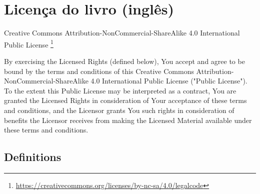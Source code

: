 \chapter{Licença do livro (inglês)}

Creative Commons Attribution-NonCommercial-ShareAlike 4.0 International Public License \footnote{
\url{https://creativecommons.org/licenses/by-nc-sa/4.0/legalcode}}

By exercising the Licensed Rights (defined below), You accept and agree to be bound by the terms and conditions of this Creative Commons Attribution-NonCommercial-ShareAlike 4.0 International Public License ("Public License"). To the extent this Public License may be interpreted as a contract, You are granted the Licensed Rights in consideration of Your acceptance of these terms and conditions, and the Licensor grants You such rights in consideration of benefits the Licensor receives from making the Licensed Material available under these terms and conditions.

\section*{Definitions}

